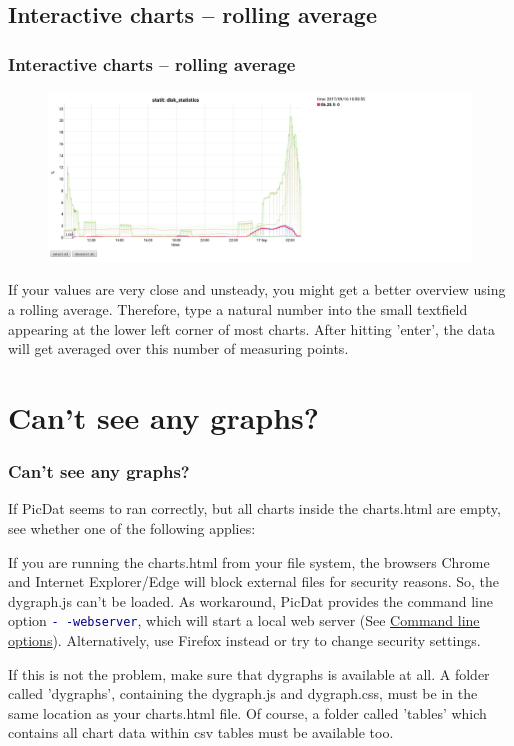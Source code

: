 \documentclass[8pt]{beamer}
\begin{document}
\subsection{Interactive charts -- rolling average}
\begin{frame}
\frametitle{Interactive charts -- rolling average} 
\begin{figure}
	\includegraphics[width=\textwidth]{../images/PicDat_roller.png}
\end{figure}

If your values are very close and unsteady, you might get a better overview using a rolling average. Therefore, type a natural number into the small textfield appearing at the lower left corner of most charts. After hitting 'enter', the data will get averaged over this number of measuring points.
\end{frame}

\section{Can't see any graphs?}
\begin{frame}
\frametitle{Can't see any graphs?}
If PicDat seems to ran correctly, but all charts inside the charts.html are empty, see whether one of the following applies:
\bigskip

If you are running the charts.html from your file system, the browsers Chrome and Internet Explorer/Edge will block external files for security reasons. So, the dygraph.js can't be loaded. As workaround, PicDat provides the command line option \textcolor{darkblue}{\texttt{-\,-webserver}}, which will start a local web server (See \hyperref[options]{\underline{Command line options}}). Alternatively, use Firefox instead or try to change security settings.
\bigskip

If this is not the problem, make sure that dygraphs is available at all. A folder called 'dygraphs', containing the dygraph.js and dygraph.css, must be in the same location as your charts.html file. Of course, a folder called 'tables' which contains all chart data within csv tables must be available too.
\end{frame}
\end{document}
